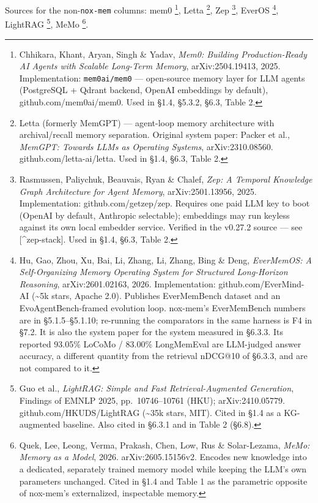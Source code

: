 \documentclass[
]{article}
\begin{document}
Sources for the non-\texttt{nox-mem} columns: mem0 \footnote{Chhikara,
  Khant, Aryan, Singh \& Yadav, \emph{Mem0: Building Production-Ready AI
  Agents with Scalable Long-Term Memory}, arXiv:2504.19413, 2025.
  Implementation: \texttt{mem0ai/mem0} --- open-source memory layer for
  LLM agents (PostgreSQL + Qdrant backend, OpenAI embeddings by
  default), github.com/mem0ai/mem0. Used in §1.4, §5.3.2, §6.3, Table 2.},
Letta \footnote{Letta (formerly MemGPT) --- agent-loop memory
  architecture with archival/recall memory separation. Original system
  paper: Packer et al., \emph{MemGPT: Towards LLMs as Operating
  Systems}, arXiv:2310.08560. github.com/letta-ai/letta. Used in §1.4,
  §6.3, Table 2.}, Zep \footnote{Rasmussen, Paliychuk, Beauvais, Ryan \&
  Chalef, \emph{Zep: A Temporal Knowledge Graph Architecture for Agent
  Memory}, arXiv:2501.13956, 2025. Implementation:
  github.com/getzep/zep. Requires one paid LLM key to boot (OpenAI by
  default, Anthropic selectable); embeddings may run keyless against its
  own local embedder service. Verified in the v0.27.2 source --- see
  {[}\^{}zep-stack{]}. Used in §1.4, §6.3, Table 2.}, EverOS
\footnote{Hu, Gao, Zhou, Xu, Bai, Li, Zhang, Li, Zhang, Bing \& Deng,
  \emph{EverMemOS: A Self-Organizing Memory Operating System for
  Structured Long-Horizon Reasoning}, arXiv:2601.02163, 2026.
  Implementation: github.com/EverMind-AI (\textasciitilde5k stars,
  Apache 2.0). Publishes EverMemBench dataset and an
  EvoAgentBench-framed evolution loop. nox-mem's EverMemBench numbers
  are in §5.1.5--§5.1.10; re-running the comparators in the same harness
  is F4 in §7.2. It is also the system paper for the system measured in
  §6.3.3. Its reported 93.05\% LoCoMo / 83.00\% LongMemEval are
  LLM-judged answer accuracy, a different quantity from the retrieval
  nDCG@10 of §6.3.3, and are not compared to it.}, LightRAG \footnote{Guo
  et al., \emph{LightRAG: Simple and Fast Retrieval-Augmented
  Generation}, Findings of EMNLP 2025, pp.~10746--10761 (HKU);
  arXiv:2410.05779. github.com/HKUDS/LightRAG (\textasciitilde35k stars,
  MIT). Cited in §1.4 as a KG-augmented baseline. Also cited in §6.3.1
  and in Table 2 (§6.8).}, MeMo \footnote{Quek, Lee, Leong, Verma,
  Prakash, Chen, Low, Rus \& Solar-Lezama, \emph{MeMo: Memory as a
  Model}, 2026. arXiv:2605.15156v2. Encodes new knowledge into a
  dedicated, separately trained memory model while keeping the LLM's own
  parameters unchanged. Cited in §1.4 and Table 1 as the parametric
  opposite of nox-mem's externalized, inspectable memory.}.
\end{document}
